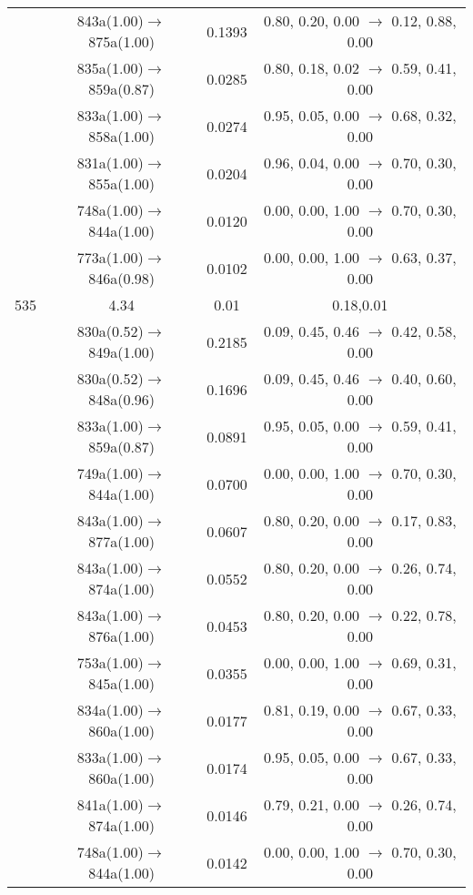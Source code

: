 \documentclass[10pt,a4paper]{article}
\begin{document}
\begin{longtable}{c|c|c|c}
 	& 843a(1.00)$\rightarrow$875a(1.00) &	 0.1393 &	 0.80, 0.20, 0.00 $\rightarrow$ 0.12, 0.88, 0.00 \\ 
 	& 835a(1.00)$\rightarrow$859a(0.87) &	 0.0285 &	 0.80, 0.18, 0.02 $\rightarrow$ 0.59, 0.41, 0.00 \\ 
 	& 833a(1.00)$\rightarrow$858a(1.00) &	 0.0274 &	 0.95, 0.05, 0.00 $\rightarrow$ 0.68, 0.32, 0.00 \\ 
 	& 831a(1.00)$\rightarrow$855a(1.00) &	 0.0204 &	 0.96, 0.04, 0.00 $\rightarrow$ 0.70, 0.30, 0.00 \\ 
 	& 748a(1.00)$\rightarrow$844a(1.00) &	 0.0120 &	 0.00, 0.00, 1.00 $\rightarrow$ 0.70, 0.30, 0.00 \\ 
 	& 773a(1.00)$\rightarrow$846a(0.98) &	 0.0102 &	 0.00, 0.00, 1.00 $\rightarrow$ 0.63, 0.37, 0.00 \\ 
 \hline535 &	 4.34 &	 0.01 &	 0.18,0.01 \\ 
  	& 830a(0.52)$\rightarrow$849a(1.00) &	 0.2185 &	 0.09, 0.45, 0.46 $\rightarrow$ 0.42, 0.58, 0.00 \\ 
 	& 830a(0.52)$\rightarrow$848a(0.96) &	 0.1696 &	 0.09, 0.45, 0.46 $\rightarrow$ 0.40, 0.60, 0.00 \\ 
 	& 833a(1.00)$\rightarrow$859a(0.87) &	 0.0891 &	 0.95, 0.05, 0.00 $\rightarrow$ 0.59, 0.41, 0.00 \\ 
 	& 749a(1.00)$\rightarrow$844a(1.00) &	 0.0700 &	 0.00, 0.00, 1.00 $\rightarrow$ 0.70, 0.30, 0.00 \\ 
 	& 843a(1.00)$\rightarrow$877a(1.00) &	 0.0607 &	 0.80, 0.20, 0.00 $\rightarrow$ 0.17, 0.83, 0.00 \\ 
 	& 843a(1.00)$\rightarrow$874a(1.00) &	 0.0552 &	 0.80, 0.20, 0.00 $\rightarrow$ 0.26, 0.74, 0.00 \\ 
 	& 843a(1.00)$\rightarrow$876a(1.00) &	 0.0453 &	 0.80, 0.20, 0.00 $\rightarrow$ 0.22, 0.78, 0.00 \\ 
 	& 753a(1.00)$\rightarrow$845a(1.00) &	 0.0355 &	 0.00, 0.00, 1.00 $\rightarrow$ 0.69, 0.31, 0.00 \\ 
 	& 834a(1.00)$\rightarrow$860a(1.00) &	 0.0177 &	 0.81, 0.19, 0.00 $\rightarrow$ 0.67, 0.33, 0.00 \\ 
 	& 833a(1.00)$\rightarrow$860a(1.00) &	 0.0174 &	 0.95, 0.05, 0.00 $\rightarrow$ 0.67, 0.33, 0.00 \\ 
 	& 841a(1.00)$\rightarrow$874a(1.00) &	 0.0146 &	 0.79, 0.21, 0.00 $\rightarrow$ 0.26, 0.74, 0.00 \\ 
 	& 748a(1.00)$\rightarrow$844a(1.00) &	 0.0142 &	 0.00, 0.00, 1.00 $\rightarrow$ 0.70, 0.30, 0.00 \\ 

\end{longtable}
\end{document}
